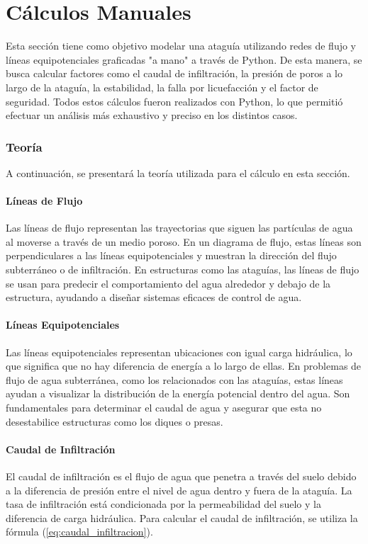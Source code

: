 \part{Cálculos Manuales}

Esta sección tiene como objetivo modelar una ataguía utilizando redes de flujo y líneas equipotenciales graficadas "a mano" a través de Python. De esta manera, se busca calcular factores como el caudal de infiltración, la presión de poros a lo largo de la ataguía, la estabilidad, la falla por licuefacción y el factor de seguridad. Todos estos cálculos fueron realizados con Python, lo que permitió efectuar un análisis más exhaustivo y preciso en los distintos casos.

\section{Teoría}

A continuación, se presentará la teoría utilizada para el cálculo en esta sección.

\subsection{Líneas de Flujo}
Las líneas de flujo representan las trayectorias que siguen las partículas de agua al moverse a través de un medio poroso. En un diagrama de flujo, estas líneas son perpendiculares a las líneas equipotenciales y muestran la dirección del flujo subterráneo o de infiltración. En estructuras como las ataguías, las líneas de flujo se usan para predecir el comportamiento del agua alrededor y debajo de la estructura, ayudando a diseñar sistemas eficaces de control de agua. \textbf{\cite{structville}}

\subsection{Líneas Equipotenciales}
Las líneas equipotenciales representan ubicaciones con igual carga hidráulica, lo que significa que no hay diferencia de energía a lo largo de ellas. En problemas de flujo de agua subterránea, como los relacionados con las ataguías, estas líneas ayudan a visualizar la distribución de la energía potencial dentro del agua. Son fundamentales para determinar el caudal de agua y asegurar que esta no desestabilice estructuras como los diques o presas. \textbf{\cite{structville}}

\subsection{Caudal de Infiltración}
El caudal de infiltración es el flujo de agua que penetra a través del suelo debido a la diferencia de presión entre el nivel de agua dentro y fuera de la ataguía. La tasa de infiltración está condicionada por la permeabilidad del suelo y la diferencia de carga hidráulica. Para calcular el caudal de infiltración, se utiliza la fórmula (\ref{eq:caudal_infiltracion}). \textbf{\cite{stability_cofferdam_2024}}

